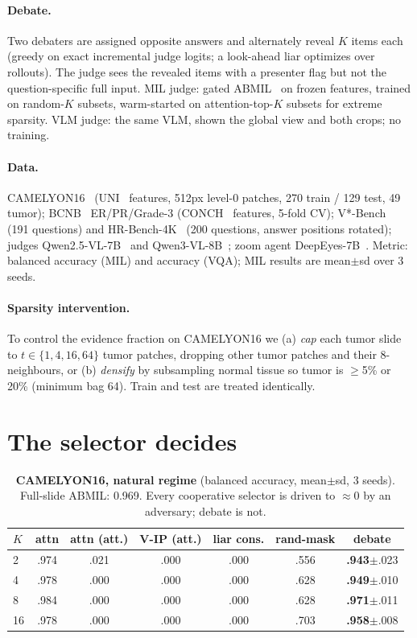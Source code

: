 \documentclass[10pt,twocolumn,letterpaper]{article}
\begin{document}
\paragraph{Debate.} Two debaters are assigned opposite answers and alternately reveal $K$ items each (greedy on exact incremental judge logits; a look-ahead liar optimizes over rollouts). The judge sees the revealed items with a presenter flag but not the question-specific full input. MIL judge: gated ABMIL~\cite{ilse2018abmil} on frozen features, trained on random-$K$ subsets, warm-started on attention-top-$K$ subsets for extreme sparsity. VLM judge: the same VLM, shown the global view and both crops; no training.
\paragraph{Data.} CAMELYON16~\cite{c16} (UNI~\cite{uni} features, 512px level-0 patches, 270 train / 129 test, 49 tumor); BCNB~\cite{bcnb} ER/PR/Grade-3 (CONCH~\cite{conch} features, 5-fold CV); V*-Bench~\cite{wu2024vstar} (191 questions) and HR-Bench-4K~\cite{hrbench} (200 questions, answer positions rotated); judges Qwen2.5-VL-7B~\cite{qwen25vl} and Qwen3-VL-8B~\cite{qwen3vl}; zoom agent DeepEyes-7B~\cite{zheng2025deepeyes}. Metric: balanced accuracy (MIL) and accuracy (VQA); MIL results are mean$\pm$sd over 3 seeds.
\paragraph{Sparsity intervention.} To control the evidence fraction on CAMELYON16 we (a) \emph{cap} each tumor slide to $t\in\{1,4,16,64\}$ tumor patches, dropping other tumor patches and their 8-neighbours, or (b) \emph{densify} by subsampling normal tissue so tumor is $\ge$5\% or 20\% (minimum bag 64). Train and test are treated identically.

\section{The selector decides}\label{sec:threat}
\begin{table}[t]\centering\small
\caption{\textbf{CAMELYON16, natural regime} (balanced accuracy, mean$\pm$sd, 3 seeds). Full-slide ABMIL: 0.969. Every cooperative selector is driven to $\approx$0 by an adversary; debate is not.}\label{tab:c16}
\setlength{\tabcolsep}{3pt}
\begin{tabular}{@{}lcccccc@{}}\toprule
$K$ & attn & attn (att.) & V-IP (att.) & liar cons. & rand-mask & debate\\\midrule
2  & .974 & .021 & .000 & .000 & .556 & \textbf{.943}$\pm$.023\\
4  & .978 & .000 & .000 & .000 & .628 & \textbf{.949}$\pm$.010\\
8  & .984 & .000 & .000 & .000 & .628 & \textbf{.971}$\pm$.011\\
16 & .978 & .000 & .000 & .000 & .703 & \textbf{.958}$\pm$.008\\\bottomrule
\end{tabular}\end{table}
\end{document}
